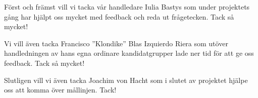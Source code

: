 Först och främst vill vi tacka vår handledare Iulia Bastys som under projektets gång har hjälpt oss mycket med feedback och reda ut frågetecken.
Tack så mycket!

Vi vill även tacka Francisco ''Klondike'' Blas Izquierdo Riera som utöver handledningen av hans egna ordinare kandidatgrupper lade ner tid för att ge oss feedback.
Tack så mycket!

Slutligen vill vi även tacka Joachim von Hacht som i slutet av projektet hjälpe oss att komma över mållinjen.
Tack!
